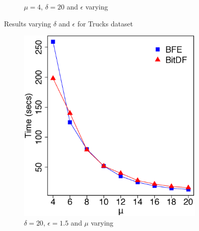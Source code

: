 {\begin{figure}[h!]
\begin{subfigure}[t]{0.48\textwidth}
        \caption{$\mu = 4$, $\delta = 20$ and $\epsilon$ varying}
        \label{fig:trucks_vary_g}
    \end{subfigure}
    \caption{Results varying $\delta$ and $\epsilon$ for Trucks dataset}
    \label{fig:trucks_results}
\end{figure}

\begin{figure}[h!]
    \begin{subfigure}[t]{0.48\textwidth}
        \includegraphics[width=\textwidth]{images/Trucks_l_20_g_1_5_varying_n.eps}
        \caption{$\delta = 20$, $\epsilon = 1.5$ and $\mu$ varying}
        \label{fig:trucks_vary_n}
    \end{subfigure}
    \begin{subfigure}[t]{0.48\textwidth}

\end{subfigure}
\end{figure}}
